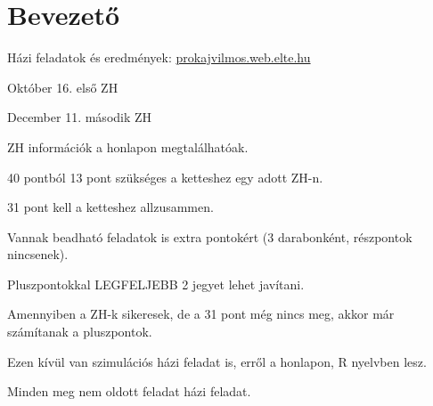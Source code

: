 \documentclass[a4paper,11.5pt]{article}
\begin{document}
	\section{Bevezető}
	\begin{compactitem}
		\item Házi feladatok és eredmények: \url{prokajvilmos.web.elte.hu}
		\item Október 16. első ZH
		\item December 11. második ZH
		\item ZH információk a honlapon megtalálhatóak.
		\item 40 pontból 13 pont szükséges a ketteshez egy adott ZH-n.
		\item 31 pont kell a ketteshez allzusammen.
		\item Vannak beadható feladatok is extra pontokért (3 darabonként, részpontok nincsenek).
		\item Pluszpontokkal LEGFELJEBB 2 jegyet lehet javítani.
		\item Amennyiben a ZH-k sikeresek, de a 31 pont még nincs meg, akkor már számítanak a pluszpontok.
		\item Ezen kívül van szimulációs házi feladat is, erről a honlapon, R nyelvben lesz.
		\item Minden meg nem oldott feladat házi feladat.
	\end{compactitem}
\end{document}
